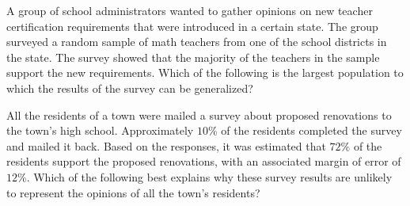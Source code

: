 
\vspace{2em}

\noindent\markforreview
\vspace{1em}

A group of school administrators wanted to gather opinions on new teacher certification requirements that were introduced in a certain state. The group surveyed a random sample of math teachers from one of the school districts in the state. The survey showed that the majority of the teachers in the sample support the new requirements. Which of the following is the largest population to which the results of the survey can be generalized?


\vspace{2em}

\noindent\markforreview
\vspace{1em}

All the residents of a town were mailed a survey about proposed renovations to the town's high school. Approximately $10\%$ of the residents completed the survey and mailed it back. Based on the responses, it was estimated that $72\%$ of the residents support the proposed renovations, with an associated margin of error of $12\%$. Which of the following best explains why these survey results are unlikely to represent the opinions of all the town's residents?


\vspace{2em}

